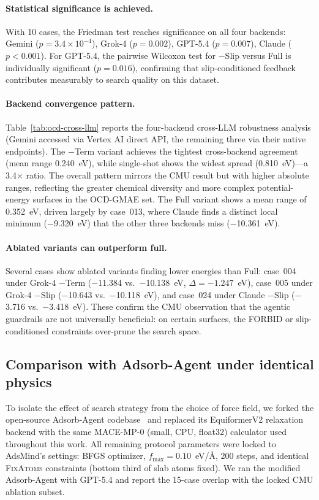 \paragraph{Statistical significance is achieved.}
With 10 cases, the Friedman test reaches significance on all four backends: Gemini ($p = 3.4 \times 10^{-4}$), Grok-4 ($p = 0.002$), GPT-5.4 ($p = 0.007$), Claude ($p < 0.001$).
For GPT-5.4, the pairwise Wilcoxon test for $-$Slip versus Full is individually significant ($p = 0.016$), confirming that slip-conditioned feedback contributes measurably to search quality on this dataset.

\paragraph{Backend convergence pattern.}
Table~\ref{tab:ocd-cross-llm} reports the four-backend cross-LLM robustness analysis (Gemini accessed via Vertex AI direct API, the remaining three via their native endpoints).
The $-$Term variant achieves the tightest cross-backend agreement (mean range 0.240~eV), while single-shot shows the widest spread (0.810~eV)---a 3.4$\times$ ratio.
The overall pattern mirrors the CMU result but with higher absolute ranges, reflecting the greater chemical diversity and more complex potential-energy surfaces in the OCD-GMAE set.
The Full variant shows a mean range of 0.352~eV, driven largely by case~013, where Claude finds a distinct local minimum ($-$9.320~eV) that the other three backends miss ($-$10.361~eV).

\paragraph{Ablated variants can outperform full.}
Several cases show ablated variants finding lower energies than Full: case~004 under Grok-4 $-$Term ($-$11.384 vs.\ $-$10.138~eV, $\Delta = -1.247$~eV), case~005 under Grok-4 $-$Slip ($-$10.643 vs.\ $-$10.118~eV), and case~024 under Claude $-$Slip ($-$3.716 vs.\ $-$3.418~eV).
These confirm the CMU observation that the agentic guardrails are not universally beneficial: on certain surfaces, the FORBID or slip-conditioned constraints over-prune the search space.

\subsection{Comparison with Adsorb-Agent under identical physics}

To isolate the effect of search strategy from the choice of force field, we forked the open-source Adsorb-Agent codebase~\cite{adsorbagent} and replaced its EquiformerV2 relaxation backend with the same MACE-MP-0 (small, CPU, float32) calculator used throughout this work.
All remaining protocol parameters were locked to AdsMind's settings: BFGS optimizer, $f_\mathrm{max} = 0.10$~eV/\AA, 200 steps, and identical \textsc{FixAtoms} constraints (bottom third of slab atoms fixed).
We ran the modified Adsorb-Agent with GPT-5.4 and report the 15-case overlap with the locked CMU ablation subset.

